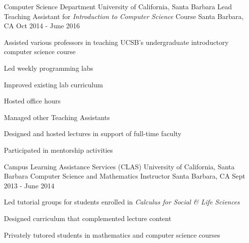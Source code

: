 \begin{cventries}
  \cventry
{Computer Science Department \newline University of California, Santa Barbara}
    {Lead Teaching Assistant for \emph{Introduction to Computer Science} Course}
    {Santa Barbara, CA}
    {Oct 2014 - June 2016}
    {
      \begin{cvitems}
	\item {Assisted various professors in teaching UCSB's undergraduate introductory computer science course}\\
	 \begin{cvitems}
        \item {Led weekly programming labs}
        \item Improved existing lab curriculum
        \item {Hosted office hours}
        \item {Managed other Teaching Assistants}
	\item {Designed and hosted lectures in support of full-time faculty}
	\end{cvitems}
	\vspace{2mm}
	\item Participated in mentorship activities
      \end{cvitems}
    }

  \cventry
{Campus Learning Assistance Services (CLAS) \newline University of California, Santa Barbara}
    {Computer Science and Mathematics Instructor}
    {Santa Barbara, CA}
    {Sept 2013 - June 2014}
    {
      \begin{cvitems}
	\item {Led tutorial groups for students enrolled in \emph{Calculus for Social \& Life Sciences}}
	\item {Designed curriculum that complemented lecture content}
        \item {Privately tutored students in mathematics and computer science courses}
      \end{cvitems}
    }




  \end{cventries}
